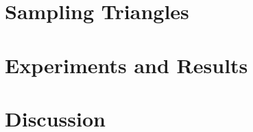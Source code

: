 \documentclass[11pt]{beamer}
\begin{document}
\section{Sampling Triangles}
\begin{frame}
\end{frame}
\section{Experiments and Results}
\begin{frame}
\end{frame}
\section{Discussion}
\begin{frame}
\end{frame}
\end{document}
